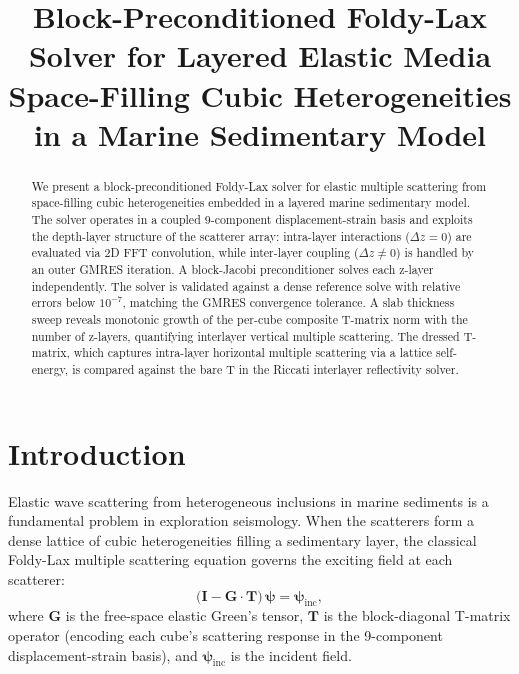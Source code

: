 \documentclass[11pt,a4paper]{article}
\title{%
  Block-Preconditioned Foldy-Lax Solver for Layered Elastic Media\\[6pt]
  \large Space-Filling Cubic Heterogeneities in a Marine Sedimentary Model%
}
\author{}
\date{}
\theoremstyle{plain}
\theoremstyle{remark}
\begin{document}
\maketitle
\thispagestyle{fancy}

\begin{abstract}
We present a block-preconditioned Foldy-Lax solver for elastic multiple
scattering from space-filling cubic heterogeneities embedded in a layered
marine sedimentary model.  The solver operates in a coupled 9-component
displacement-strain basis and exploits the depth-layer structure of the
scatterer array: intra-layer interactions ($\Delta z = 0$) are evaluated
via 2D FFT convolution, while inter-layer coupling ($\Delta z \ne 0$) is
handled by an outer GMRES iteration.  A block-Jacobi preconditioner
solves each z-layer independently.  The solver is validated against a
dense reference solve with relative errors below $10^{-7}$, matching the
GMRES convergence tolerance.  A slab thickness sweep reveals monotonic
growth of the per-cube composite T-matrix norm with the number of
z-layers, quantifying interlayer vertical multiple scattering.
The dressed T-matrix, which captures intra-layer horizontal multiple
scattering via a lattice self-energy, is compared against the bare T
in the Riccati interlayer reflectivity solver.
\end{abstract}

\section{Introduction}\label{sec:intro}

Elastic wave scattering from heterogeneous inclusions in marine sediments
is a fundamental problem in exploration seismology.  When the scatterers
form a dense lattice of cubic heterogeneities filling a sedimentary layer,
the classical Foldy-Lax multiple scattering equation governs the exciting
field at each scatterer:
\begin{equation}\label{eq:foldy-lax}
  \bigl(\mathbf{I} - \mathbf{G} \cdot \mathbf{T}\bigr)\,\bm{\psi}
  = \bm{\psi}_{\mathrm{inc}},
\end{equation}
where $\mathbf{G}$ is the free-space elastic Green's tensor,
$\mathbf{T}$ is the block-diagonal T-matrix operator (encoding each
cube's scattering response in the 9-component displacement-strain basis),
and $\bm{\psi}_{\mathrm{inc}}$ is the incident field.
\end{document}
